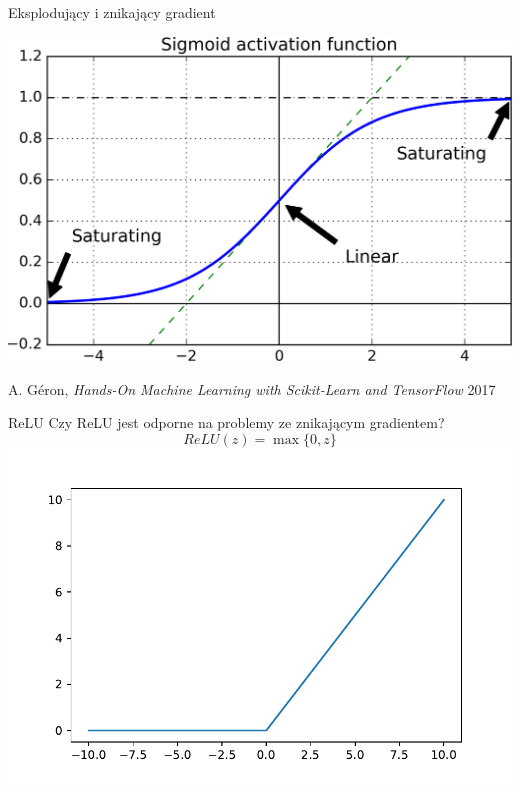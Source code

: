 \documentclass{sa}
\begin{document}
\begin{frame}{Eksplodujący i znikający gradient}
\begin{center}
\includegraphics[width=.8\textwidth]{sigmoid_saturation.png}
\end{center}
{\vfill\footnotesize A. Géron, \emph{Hands-On Machine Learning with Scikit-Learn and TensorFlow} 2017}
\end{frame}

\begin{frame}{ReLU}
\alert{Czy ReLU jest odporne na problemy ze znikającym gradientem?}
\[ ReLU(z) = \max\{0, z\} \]
\centering
\includegraphics[width=.9\textwidth]{relu.pdf}
\end{frame}
\end{document}
